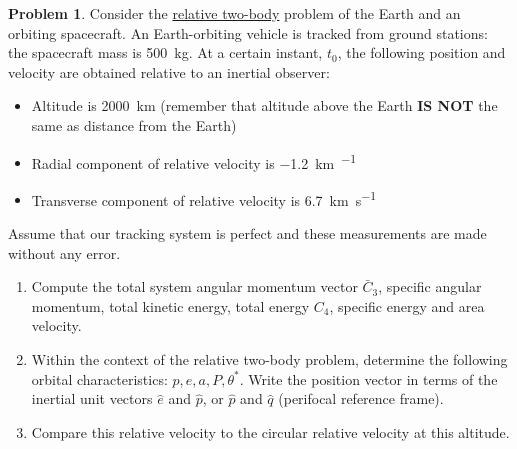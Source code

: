 \documentclass[10pt]{article}
\theoremstyle{definition}
\newtheorem{prob}{Problem}[section]
\newenvironment{subprob}%
{\renewcommand{\theenumi}{\alph{enumi}}\renewcommand{\labelenumi}{(\theenumi)}\begin{enumerate}}%
{\end{enumerate}}%
\begin{document}
\begin{prob}
    Consider the \underline{relative two-body} problem of the Earth and an orbiting spacecraft.
    An Earth-orbiting vehicle is tracked from ground stations: the spacecraft mass is \SI{500}{\kilo\gram}.
    At a certain instant, \( t_0 \), the following position and velocity are obtained relative to an inertial observer:
    \begin{itemize}
        \item Altitude is \SI{2000}{\kilo\meter} (remember that altitude above the Earth  \textbf{IS NOT} the same as distance from the Earth)
        \item Radial component of relative velocity is \SI{-1.2}{\kilo\meter\per\sec}
        \item Transverse component of relative velocity is \SI{6.7}{\kilo\meter\per\second}
    \end{itemize}

    Assume that our tracking system is perfect and these measurements are made without any error.
    \begin{subprob}
        \item Compute the total system angular momentum vector \( \bar C_3 \), specific angular momentum, total kinetic energy, total energy \( C_4 \), specific energy and area velocity.
        \item Within the context of the relative two-body problem, determine the following orbital characteristics: \( p, e, a, P, \theta^* \).
            Write the position vector in terms of the inertial unit vectors \( \hat e\) and \( \hat p \), or \( \hat p \) and \( \hat q \) (perifocal reference frame).
        \item Compare this relative velocity to the circular relative velocity at this altitude.
    \end{subprob}
\end{prob}
\end{document}

